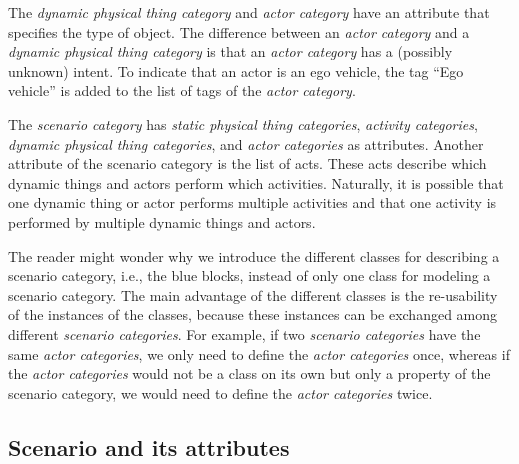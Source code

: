 The \cstartb \textit{dynamic physical thing category} and \cendb \textit{actor category} have an attribute that specifies the type of object.
\cstartb The difference between an \textit{actor category} and a \textit{dynamic physical thing category} is that an \textit{actor category} has a (possibly unknown) intent. \cendb
To indicate that an actor is an ego vehicle, the tag ``Ego vehicle'' is added to the list of tags of the \textit{actor category}.

The \textit{scenario category} has \cstartc \textit{static physical thing categories}\cendc, \textit{activity categories}, \cstartb \textit{dynamic physical thing categories}, \cendb and \textit{actor categories} as attributes. 
Another attribute of the scenario category is the list of acts. %
These acts describe which \cstartb dynamic things and \cendb actors perform which activities. Naturally, it is possible that one \cstartb dynamic thing or \cendb actor performs multiple activities and that one activity is performed by multiple \cstartb dynamic things and \cendb actors.

The reader might wonder why we introduce the different classes for describing a scenario category, i.e., the blue blocks, instead of only one class for modeling a scenario category. 
The main advantage of the different classes is the re-usability of the instances of the classes, because these instances can be exchanged among different \textit{scenario categories}. For example, if two \textit{scenario categories} have the same \textit{actor categories}, we only need to define the \textit{actor categories} once, whereas if the \textit{actor categories} would not be a class on its own but only a property of the scenario category, we would need to define the \textit{actor categories} twice.



\subsection{Scenario and its attributes}
\label{sec:domain scenario}

